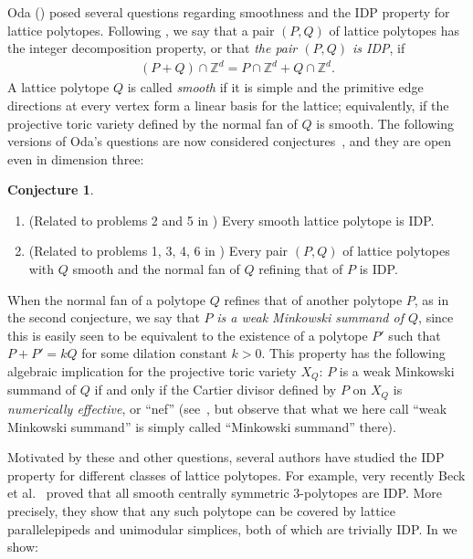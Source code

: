 \documentclass{amsart}
\theoremstyle{plain}
\theoremstyle{definition}
\newtheorem{conjecture}[theorem]{Conjecture}
\newcommand{\Z}{ \ensuremath{\mathbb{Z}}}
\newcommand{\paco}[1]{\todo[size=\tiny,color=green!30]{#1 \\ \hfill --- P.}}
\begin{document}
Oda (\cite{Oda1997}) posed several questions regarding smoothness and the IDP property for lattice polytopes.
%
Following \cite{HaaseHof, Tsuchiya}, we say that a pair $(P, Q)$ of lattice polytopes has the integer decomposition property, or that \emph{the pair $(P,Q)$ is IDP}, if 
\begin{align*}
\label{eq:mixedIDP}
(P+Q) \cap \Z^d = P \cap \Z^d + Q \cap \Z^d.
\end{align*}
%
A lattice polytope $Q$ is called \emph{smooth} if it is simple and the primitive edge directions at every vertex form a linear basis for the lattice; equivalently, if the projective toric variety defined by the normal fan of $Q$ is smooth. 
The following versions of Oda's questions are now considered conjectures~\cite{HNPS2008,mfo2007}, and they are open even in dimension three:
\begin{conjecture}
\label{conj:Oda}
\begin{enumerate}
\item 
\label{itm:smoothIDP}
(Related to problems 2 and 5 in \cite{Oda1997})
Every smooth lattice polytope is IDP.
\item 
\label{itm:mixedIDP}
(Related to problems 1, 3, 4, 6 in \cite{Oda1997}) Every pair $(P,Q)$ of lattice polytopes with $Q$ smooth and the normal fan of $Q$ refining that of $P$ is IDP.
\end{enumerate}
\end{conjecture}

When the normal fan of a polytope $Q$ refines that of another polytope $P$, as in the second conjecture, we say that $P$ \emph{is a weak Minkowski summand of $Q$}, since this is easily seen to be equivalent to the existence of a polytope $P'$ such that $P+P' = k Q$ for some dilation constant $k>0$.
This property has the following algebraic implication for the projective toric variety $X_Q$: $P$ is a weak Minkowski summand of $Q$ if and only if the Cartier divisor defined by $P$ on  $X_Q$ is \emph{numerically effective}, or ``nef'' (see~\cite[Cor.~6.2.15, Prop.~6.3.12]{CLS}, but observe that what we here call  ``weak Minkowski summand'' is simply called ``Minkowski summand'' there). 


\medskip 
Motivated by these and other questions, several authors have studied the IDP property for different classes of lattice polytopes. 
%
For example,  very recently
Beck et al.~\cite{BHHHJKM2019} proved that all smooth centrally symmetric $3$-polytopes are IDP.
More precisely, they show that any such polytope can be covered by lattice 
parallelepipeds and unimodular simplices, both of which are trivially IDP.
%
In  we show:
\end{document}

